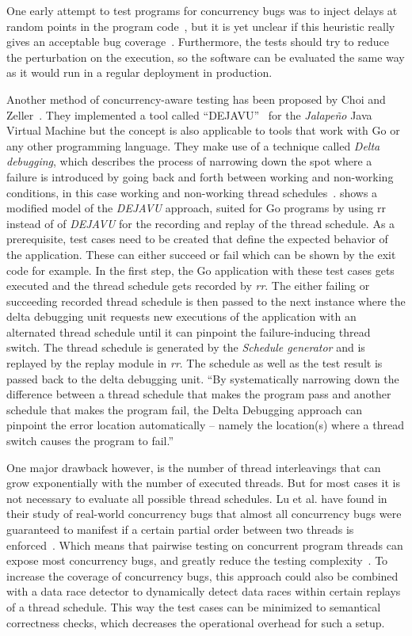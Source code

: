\documentclass[conference]{IEEEtran}
\begin{document}
One early attempt to test programs for concurrency bugs was to inject delays at random points in the program code~\cite{bron2005coverage}, but it is yet unclear if this heuristic really gives an acceptable bug coverage~\cite{lu2008mistakes}.
Furthermore, the tests should try to reduce the perturbation on the execution, so the software can be evaluated the same way as it would run in a regular deployment in production.

Another method of concurrency-aware testing has been proposed by Choi and Zeller~\cite{acm2002}.
They implemented a tool called ``DEJAVU''~\cite{acm2002} for the \emph{Jalapeño} Java Virtual Machine but the concept is also applicable to tools that work with Go or any other programming language.
They make use of a technique called \emph{Delta debugging}, which describes the process of narrowing down the spot where a failure is introduced by going back and forth between working and non-working conditions, in this case working and non-working thread schedules~\cite{zeller2002delta}.
 shows a modified model of the \emph{DEJAVU} approach, suited for Go programs by using rr instead of of \emph{DEJAVU} for the recording and replay of the thread schedule.
As a prerequisite, test cases need to be created that define the expected behavior of the application.
These can either succeed or fail which can be shown by the exit code for example.
In the first step, the Go application with these test cases gets executed and the thread schedule gets recorded by \emph{rr}.
The either failing or succeeding recorded thread schedule is then passed to the next instance where the delta debugging unit requests new executions of the application with an alternated thread schedule until it can pinpoint the failure-inducing thread switch.
The thread schedule is generated by the \emph{Schedule generator} and is replayed by the replay module in \emph{rr}.
The schedule as well as the test result is passed back to the delta debugging unit.
``By systematically narrowing down the difference between a thread schedule that makes the program pass and another schedule that makes the program fail, the Delta Debugging approach can pinpoint the error location automatically -- namely the location(s) where a thread switch causes the program to fail.''~\cite{acm2002}

One major drawback however, is the number of thread interleavings that can grow exponentially with the number of executed threads.
But for most cases it is not necessary to evaluate all possible thread schedules.
Lu et al. have found in their study of real-world concurrency bugs that almost all concurrency bugs were guaranteed to manifest if a certain partial order between two threads is enforced~\cite{lu2008mistakes}.
Which means that pairwise testing on concurrent program threads can expose most concurrency bugs, and greatly reduce the testing complexity~\cite{lu2008mistakes}.
To increase the coverage of concurrency bugs, this approach could also be combined with a data race detector to dynamically detect data races within certain replays of a thread schedule.
This way the test cases can be minimized to semantical correctness checks, which decreases the operational overhead for such a setup.
\end{document}
